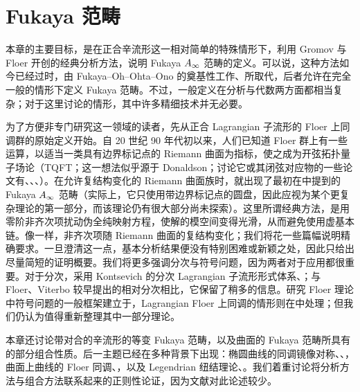\chapter{Fukaya 范畴}\label{chapter:II}
本章的主要目标，是在正合辛流形这一相对简单的特殊情形下，利用 Gromov 与 Floer 开创的经典分析方法，说明 Fukaya $A_\infty$ 范畴的定义。可以说，这种方法如今已经过时，由 Fukaya–Oh–Ohta–Ono 的奠基性工作、所取代，后者允许在完全一般的情形下定义 Fukaya 范畴。不过，一般定义在分析与代数两方面都相当复杂；对于这里讨论的情形，其中许多精细技术并无必要。

为了方便非专门研究这一领域的读者，先从正合 Lagrangian 子流形的 Floer 上同调群的原始定义开始。自 20 世纪 90 年代初以来，人们已知道 Floer 群上有一些运算，以适当一类具有边界标记点的 Riemann 曲面为指标，使之成为开弦拓扑量子场论（TQFT；这一想法似乎源于 Donaldson；讨论它或其闭弦对应物的一些论文有、、、）。在允许复结构变化的 Riemann 曲面族时，就出现了最初在中提到的 Fukaya $A_\infty$ 范畴（实际上，它只使用带边界标记点的圆盘，因此应视为某个更复杂理论的第一部分，而该理论仍有很大部分尚未探索）。这里所谓经典方法，是用零阶非齐次项扰动伪全纯映射方程，使解的模空间变得光滑，从而避免使用虚基本链。像一样，非齐次项随 Riemann 曲面的复结构变化；我们将花一些篇幅说明精确要求。一旦澄清这一点，基本分析结果便没有特别困难或新颖之处，因此只给出尽量简短的证明概要。我们将更多强调分次与符号问题，因为两者对于应用都很重要。对于分次，采用 Kontsevich 的分次 Lagrangian 子流形形式体系、；与 Floer、Viterbo 较早提出的相对分次相比，它保留了稍多的信息。研究 Floer 理论中符号问题的一般框架建立于，Lagrangian Floer 上同调的情形则在中处理；但我们仍认为值得重新整理其中一部分理论。

本章还讨论带对合的辛流形的等变 Fukaya 范畴，以及曲面的 Fukaya 范畴所具有的部分组合性质。后一主题已经在多种背景下出现：椭圆曲线的同调镜像对称、、，曲面上曲线的 Floer 同调、，以及 Legendrian 纽结理论、。我们着重讨论将分析方法与组合方法联系起来的正则性论证，因为文献对此论述较少。
